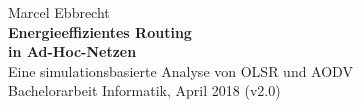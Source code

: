 \begin{titlepage}
\sffamily
\vspace*{2cm}
\begin{center}
\large{Marcel Ebbrecht}\\
\vspace*{0.5cm}
\LARGE{\textbf{Energieeffizientes Routing \\in Ad-Hoc-Netzen}}\\
\vspace*{0.25cm}
\normalsize Eine simulationsbasierte Analyse von OLSR und AODV\\
\vspace*{0.5cm}
Bachelorarbeit Informatik, April 2018 (v2.0)
\end{center}
\end{titlepage}
\thispagestyle{empty}
\cleardoublepage
